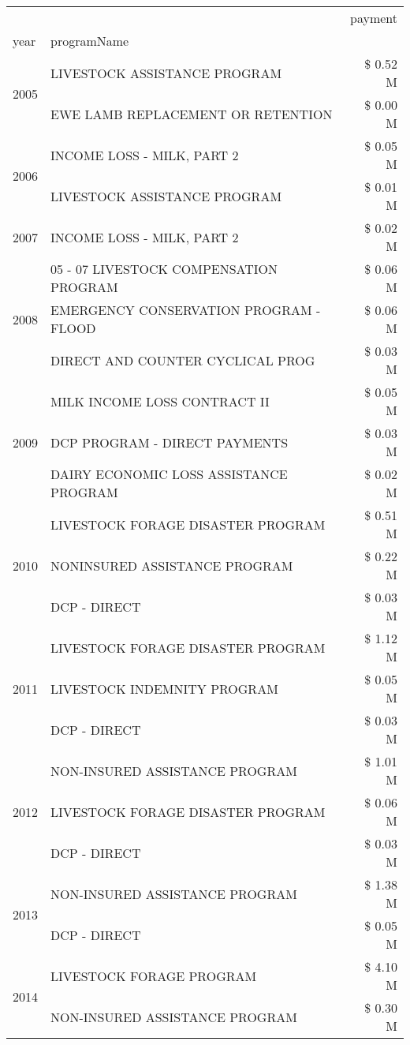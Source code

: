 \begin{tabular}{llr}
\toprule
 &  & payment \\
year & programName &  \\
\midrule
\multirow[t]{2}{*}{2005} & LIVESTOCK ASSISTANCE PROGRAM & \$ 0.52 M \\
 & EWE LAMB REPLACEMENT OR RETENTION & \$ 0.00 M \\
\cline{1-3}
\multirow[t]{2}{*}{2006} & INCOME LOSS - MILK, PART 2 & \$ 0.05 M \\
 & LIVESTOCK ASSISTANCE PROGRAM & \$ 0.01 M \\
\cline{1-3}
2007 & INCOME LOSS - MILK, PART 2 & \$ 0.02 M \\
\cline{1-3}
\multirow[t]{3}{*}{2008} & 05 - 07 LIVESTOCK COMPENSATION PROGRAM & \$ 0.06 M \\
 & EMERGENCY CONSERVATION PROGRAM - FLOOD & \$ 0.06 M \\
 & DIRECT AND COUNTER CYCLICAL PROG & \$ 0.03 M \\
\cline{1-3}
\multirow[t]{3}{*}{2009} & MILK INCOME LOSS CONTRACT II & \$ 0.05 M \\
 & DCP PROGRAM - DIRECT PAYMENTS & \$ 0.03 M \\
 & DAIRY ECONOMIC LOSS ASSISTANCE PROGRAM & \$ 0.02 M \\
\cline{1-3}
\multirow[t]{3}{*}{2010} & LIVESTOCK FORAGE DISASTER PROGRAM & \$ 0.51 M \\
 & NONINSURED ASSISTANCE PROGRAM & \$ 0.22 M \\
 & DCP - DIRECT & \$ 0.03 M \\
\cline{1-3}
\multirow[t]{3}{*}{2011} & LIVESTOCK FORAGE DISASTER PROGRAM & \$ 1.12 M \\
 & LIVESTOCK INDEMNITY PROGRAM & \$ 0.05 M \\
 & DCP - DIRECT & \$ 0.03 M \\
\cline{1-3}
\multirow[t]{3}{*}{2012} & NON-INSURED ASSISTANCE PROGRAM & \$ 1.01 M \\
 & LIVESTOCK FORAGE DISASTER PROGRAM & \$ 0.06 M \\
 & DCP - DIRECT & \$ 0.03 M \\
\cline{1-3}
\multirow[t]{2}{*}{2013} & NON-INSURED ASSISTANCE PROGRAM & \$ 1.38 M \\
 & DCP - DIRECT & \$ 0.05 M \\
\cline{1-3}
\multirow[t]{3}{*}{2014} & LIVESTOCK FORAGE PROGRAM & \$ 4.10 M \\
 & NON-INSURED ASSISTANCE PROGRAM & \$ 0.30 M \\

\end{tabular}
